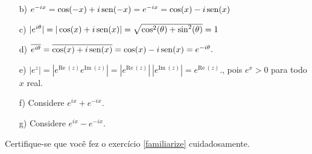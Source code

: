 \begin{Answer}
 \begin{itemize}
 \item [b)] $e^{-ix}=\cos(-x)+i\operatorname{sen}(-x)=e^{-ix}=\cos(x)-i\operatorname{sen}(x)$
 \item [c)] $|e^{i\theta}|=|\cos(x)+i\operatorname{sen}(x)|= \sqrt{\cos^2(\theta)+\sin^2(\theta)}=1$
 \item [d)] $\overline{e^{i\theta}}=\overline{\cos(x)+i\operatorname{sen}(x)}=\cos(x)-i\operatorname{sen}(x)=e^{-i\theta}.$
 \item [e)] $|e^{z}|=|e^{\text{Re}~\!( z)}e^{\text{Im}~\!( z)}|=|e^{\text{Re}~\!( z)}|~|e^{\text{Im}~\!( z)}|=e^{\text{Re}~\!( z)}.$, pois $e^x>0$ para todo $x$ real.
 \item [f)] Considere $e^{ix}+e^{-ix}$.
 \item [g)] Considere $e^{ix}-e^{-ix}$.
 \end{itemize}

\end{Answer}

\begin{Exercise} Certifique-se que você fez o exercício \ref{familiarize} cuidadosamente.
 
\end{Exercise}


%